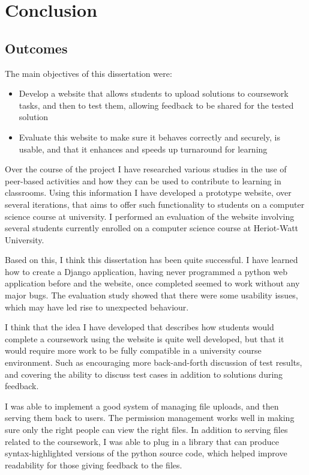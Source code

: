 \documentclass[a4paper,11pt]{report}
\begin{document}
\chapter{Conclusion}
\section{Outcomes}
The main objectives of this dissertation were:
\begin{itemize}
\item Develop a website that allows students to upload solutions to coursework tasks, and then to test them, allowing feedback to be shared for the tested solution
\item Evaluate this website to make sure it behaves correctly and securely, is usable, and that it enhances  and speeds up turnaround for learning
\end{itemize}
Over the course of the project I have researched various studies in the use of peer-based activities and how they can be used to contribute to learning in classrooms. Using this information I have developed a prototype website, over several iterations, that aims to offer such functionality to students on a computer science course at university. I performed an evaluation of the website involving several students currently enrolled on a computer science course at Heriot-Watt University.\par
Based on this, I think this dissertation has been quite successful. I have learned how to create a Django application, having never programmed a python web application before and the website, once completed seemed to work without any major bugs. The evaluation study showed that there were some usability issues, which may have led rise to unexpected behaviour.\par
I think that the idea I have developed that describes how students would complete a coursework using the website is quite well developed, but that it would require more work to be fully compatible in a university course environment. Such as encouraging more back-and-forth discussion of test results, and covering the ability to discuss test cases in addition to solutions during feedback.\par
I was able to implement a good system of managing file uploads, and then serving them back to users. The permission management works well in making sure only the right people can view the right files. In addition to serving files related to the coursework, I was able to plug in a library that can produce syntax-highlighted versions of the python source code, which helped improve readability for those giving feedback to the files.\par
\end{document}
